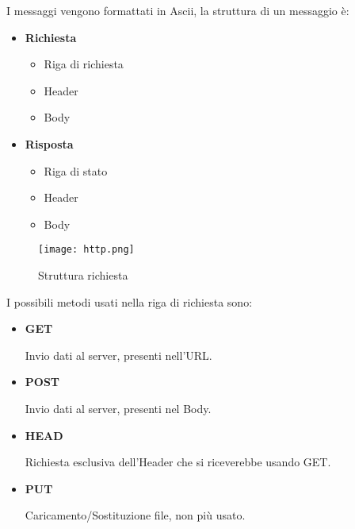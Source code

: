 \documentclass{article}
\begin{document}
\noindent I messaggi vengono formattati in Ascii, la struttura di un messaggio è:
\begin{itemize}
    \item \textbf{Richiesta}
        \begin{itemize}
            \item Riga di richiesta
            \item Header
            \item Body
        \end{itemize}
    
    \item \textbf{Risposta}
        \begin{itemize}
            \item Riga di stato
            \item Header
            \item Body\newline
        \end{itemize}
\end{itemize}

\begin{figure}[ht]
    \centering
    \texttt{[image: http.png]}
    \caption{Struttura richiesta}
    \label{fig:http}
\end{figure}

\newpage

\noindent I possibili metodi usati nella riga di richiesta sono:
\begin{itemize}
    \item \textbf{GET}

        Invio dati al server, presenti nell'URL.
    
    \item \textbf{POST}

        Invio dati al server, presenti nel Body.
    
    \item \textbf{HEAD}

        Richiesta esclusiva dell'Header che si riceverebbe usando GET.
    
    \item \textbf{PUT}

        Caricamento/Sostituzione file, non più usato.\newline
    
\end{itemize}
\end{document}
